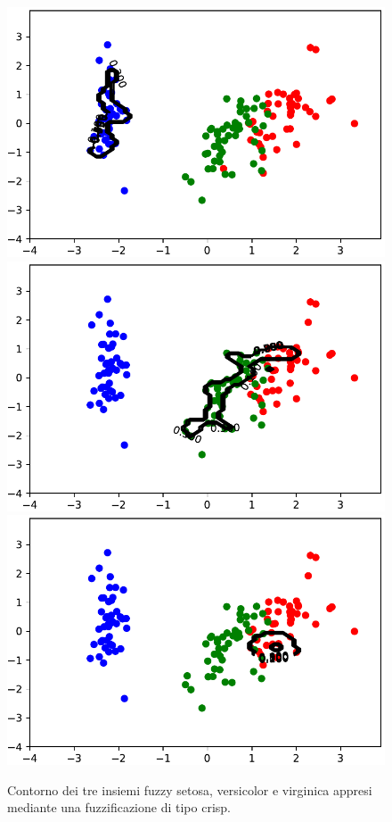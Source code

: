 \documentclass [11pt,a4paper,twoside,openright] {book}
\begin{document}
\begin{figure}[H]
        \centering%
        \subfigure%
          {\includegraphics[scale=.35, angle=90]{figure/setosacrisp.pdf}}\qquad\qquad
       \subfigure%
          {\includegraphics[scale=.35, angle=90]{figure/versicolorcrisp.pdf}}\qquad\qquad
           \subfigure%
          {\includegraphics[scale=.35, angle=90]{figure/virginicacrisp.pdf}}
          \caption{Contorno dei tre insiemi fuzzy setosa, versicolor e virginica appresi mediante una fuzzificazione di tipo crisp.\label{crispset}}
\end{figure}
\end{document}
